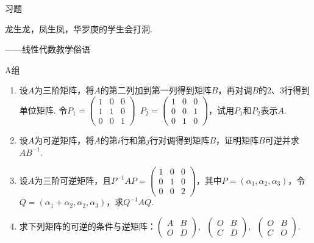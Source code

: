 \vspace{2ex}
\centerline{\heiti \Large 习题}

\vspace{2ex}
{\kaishu 龙生龙，凤生凤，华罗庚的学生会打洞.}
\begin{flushright}
    \kaishu
    ——线性代数教学俗语
\end{flushright}

\centerline{\heiti A组}
\begin{enumerate}
    \item 设$A$为三阶矩阵，将$A$的第二列加到第一列得到矩阵$B$，再对调$B$的2、3行得到单位矩阵. 令$P_1=\begin{pmatrix}1 & 0 & 0 \\ 1 & 1 & 0 \\ 0 & 0 & 1\end{pmatrix}\enspace
              P_2=\begin{pmatrix}1 & 0 & 0 \\ 0 & 0 & 1 \\ 0 & 1 & 0\end{pmatrix}$，试用$P_1$和$P_2$表示$A$.

    \item 设$A$为可逆矩阵，将$A$的第$i$行和第$j$行对调得到矩阵$B$，证明矩阵$B$可逆并求$AB^{-1}$.

    \item 设$A$为三阶可逆矩阵，且$P^{-1}AP=\begin{pmatrix}1 & 0 & 0 \\ 0 & 1 & 0 \\ 0 & 0 & 2\end{pmatrix}$，其中$P=(\alpha_1,\alpha_2,\alpha_3)$，令$Q=(\alpha_1+\alpha_2,\alpha_2,\alpha_3)$，求$Q^{-1}AQ$.

    \item 求下列矩阵的可逆的条件与逆矩阵：$\begin{pmatrix}
                  A & B \\ O & D
              \end{pmatrix},\enspace \begin{pmatrix}
                  O & B \\ C & D
              \end{pmatrix},\enspace \begin{pmatrix}
                  O & B \\ C & O
              \end{pmatrix}$.
\end{enumerate}

